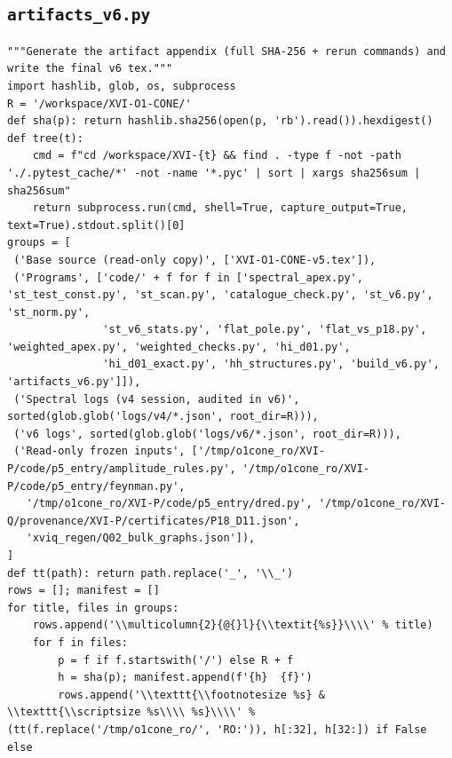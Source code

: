 \documentclass[10pt]{article}
\begin{document}
\subsection{\texttt{artifacts\_v6.py}}
\begin{lstlisting}
"""Generate the artifact appendix (full SHA-256 + rerun commands) and write the final v6 tex."""
import hashlib, glob, os, subprocess
R = '/workspace/XVI-O1-CONE/'
def sha(p): return hashlib.sha256(open(p, 'rb').read()).hexdigest()
def tree(t):
    cmd = f"cd /workspace/XVI-{t} && find . -type f -not -path './.pytest_cache/*' -not -name '*.pyc' | sort | xargs sha256sum | sha256sum"
    return subprocess.run(cmd, shell=True, capture_output=True, text=True).stdout.split()[0]
groups = [
 ('Base source (read-only copy)', ['XVI-O1-CONE-v5.tex']),
 ('Programs', ['code/' + f for f in ['spectral_apex.py', 'st_test_const.py', 'st_scan.py', 'catalogue_check.py', 'st_v6.py', 'st_norm.py',
               'st_v6_stats.py', 'flat_pole.py', 'flat_vs_p18.py', 'weighted_apex.py', 'weighted_checks.py', 'hi_d01.py',
               'hi_d01_exact.py', 'hh_structures.py', 'build_v6.py', 'artifacts_v6.py']]),
 ('Spectral logs (v4 session, audited in v6)', sorted(glob.glob('logs/v4/*.json', root_dir=R))),
 ('v6 logs', sorted(glob.glob('logs/v6/*.json', root_dir=R))),
 ('Read-only frozen inputs', ['/tmp/o1cone_ro/XVI-P/code/p5_entry/amplitude_rules.py', '/tmp/o1cone_ro/XVI-P/code/p5_entry/feynman.py',
   '/tmp/o1cone_ro/XVI-P/code/p5_entry/dred.py', '/tmp/o1cone_ro/XVI-Q/provenance/XVI-P/certificates/P18_D11.json',
   'xviq_regen/Q02_bulk_graphs.json']),
]
def tt(path): return path.replace('_', '\\_')
rows = []; manifest = []
for title, files in groups:
    rows.append('\\multicolumn{2}{@{}l}{\\textit{%s}}\\\\' % title)
    for f in files:
        p = f if f.startswith('/') else R + f
        h = sha(p); manifest.append(f'{h}  {f}')
        rows.append('\\texttt{\\footnotesize %s} & \\texttt{\\scriptsize %s\\\\ %s}\\\\' % (tt(f.replace('/tmp/o1cone_ro/', 'RO:')), h[:32], h[32:]) if False else

\end{lstlisting}
\end{document}
